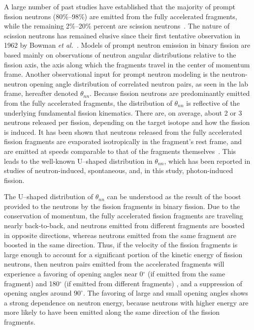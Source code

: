 A large number of past studies have established that the majority of prompt fission neutrons (80\%--98\%) are emitted from the fully accelerated fragments, while the remaining 2\%--20\% percent are scission neutrons~\cite{Scission2005}.
The nature of scission neutrons has remained elusive since their first tentative observation in 1962 by Bowman \emph{et al.}~\cite{Bowman}.
Models of prompt neutron emission in binary fission are based mainly on observations of neutron angular distributions relative to the fission axis, the axis along which the fragments travel in the center of momentum frame.
Another observational input for prompt neutron modeling is the neutron-neutron opening angle distribution of correlated neutron pairs, as seen in the lab frame, hereafter denoted $\theta_{nn}$.
Because fission neutrons are predominantly emitted from the fully accelerated fragments, the distribution of $\theta_{nn}$ is reflective of the underlying fundamental fission kinematics.
There are, on average, about 2 or 3 neutrons released per fission, depending on the target isotope and how the fission is induced.
It has been shown that neutrons released from the fully accelerated fission fragments are evaporated isotropically in the fragment's rest frame, and are emitted at speeds comparable to that of the fragments themselves~\cite{JORGENSEN}.
This leads to the well-known U--shaped distribution in $\theta_{nn}$, which has been reported in studies of neutron-induced, spontaneous, and, in this study, photon-induced fission.

The U--shaped distribution of $\theta_{nn}$ can be understood as the result of the boost provided to the neutrons by the fission fragments in binary fission.
Due to the conservation of momentum, the fully accelerated fission fragments are traveling nearly back-to-back, and neutrons emitted from different fragments are boosted in opposite directions, whereas neutrons emitted from the same fragment are boosted in the same direction.
Thus, if the velocity of the fission fragments is large enough to account for a significant portion of the kinetic energy of fission neutrons, then neutron pairs emitted from the accelerated fragments will experience a favoring of opening angles near 0$^{\circ}$ (if emitted from the same fragment) and 180$^{\circ}$ (if emitted from different fragments) , and a suppression of opening angles around $90^{\circ}$.
The favoring of large and small opening angles shows a strong dependence on neutron energy, because neutrons with higher energy are more likely to have been emitted along the same direction of the fission fragments.

